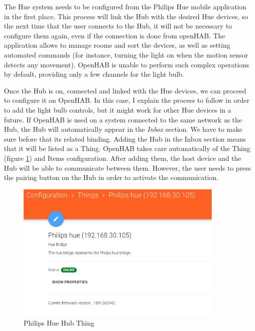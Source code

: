 The Hue system needs to be configured from the Philips Hue mobile application in the first place. This process will link the Hub with the 
desired Hue devices, so the next time that the user connects to the Hub, it will not be necessary to configure them again, even if 
the connection is done from openHAB. The application allows to manage rooms and sort the devices, as well as setting automated commands 
(for instance, turning the light on when the motion sensor detects any movement). OpenHAB is unable to perform such complex operations 
by default, providing only a few channels for the light bulb.

Once the Hub is on, connected and linked with the Hue devices, we can proceed to configure it on OpenHAB. In this case, I explain 
the process to follow in order to add the light bulb controls, but it might work for other Hue devices in a future. If OpenHAB is 
used on a system connected to the same network as the Hub, the Hub will automatically appear in the \textit{Inbox} section. We have 
to make sure before that its related binding. Adding the Hub in the Inbox section means that it will be listed as a Thing. OpenHAB 
takes care automatically of the Thing (figure \ref{fig:philips-hue-hub-thing}) and Items configuration. After adding them, the host 
device and the Hub will be able to communicate between them. However, the user needs to press the pairing button on the Hub in 
order to activate the communication.

\begin{figure}
    \centering
    \includegraphics[width=0.9\textwidth]{images/Chapter_06/philips-hue-hub-thing.png}
    \caption{Philips Hue Hub Thing}
    \label{fig:philips-hue-hub-thing}
\end{figure}

